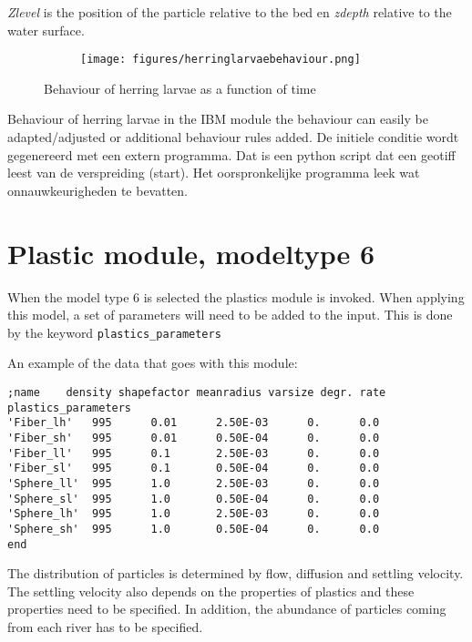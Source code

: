\documentclass[english]{deltares_manual}
\begin{document}
\textit{Zlevel} is the position of the particle relative to the bed en \textit{zdepth} relative to the water surface.
\begin{figure}[H]%
	\begin{tcolorbox}[interior hidden, 
		boxsep=0pt,
		left=0pt,
		right=0pt,
		top=0pt,]
		\begin{subfigure}{1.0\textwidth}
			\texttt{[image: figures/herringlarvaebehaviour.png]}%
		\end{subfigure}
	\end{tcolorbox}
	\caption{Behaviour of herring larvae as a function of time}
	\label{fig:herring_behaviour}
\end{figure}


Behaviour of herring larvae in the IBM module the behaviour can easily be adapted/adjusted or additional behaviour rules added.
De initiele conditie wordt gegenereerd met een extern programma. Dat is een python script dat een geotiff leest van de verspreiding (start). Het oorspronkelijke programma leek wat onnauwkeurigheden te bevatten. 

\section{Plastic module, modeltype 6}
When the model type 6 is selected the plastics module is invoked. When applying this model, a set of parameters will need to be added to the input. 
This is done by the keyword \texttt{plastics\_parameters}

An example of the data that goes with this module:
\begin{tcolorbox}
\begin{Verbatim}
;name    density shapefactor meanradius varsize degr. rate 
plastics_parameters
'Fiber_lh'   995      0.01      2.50E-03      0.      0.0
'Fiber_sh'   995      0.01      0.50E-04      0.      0.0
'Fiber_ll'   995      0.1       2.50E-03      0.      0.0
'Fiber_sl'   995      0.1       0.50E-04      0.      0.0
'Sphere_ll'  995      1.0       2.50E-03      0.      0.0
'Sphere_sl'  995      1.0       0.50E-04      0.      0.0
'Sphere_lh'  995      1.0       2.50E-03      0.      0.0
'Sphere_sh'  995      1.0       0.50E-04      0.      0.0
end
\end{Verbatim}
\end{tcolorbox}

The distribution of particles is determined by flow, diffusion and settling velocity. The settling velocity also depends on the properties of plastics and these properties need to be specified. In addition, the abundance of particles coming from each river has to be specified.
\end{document}
